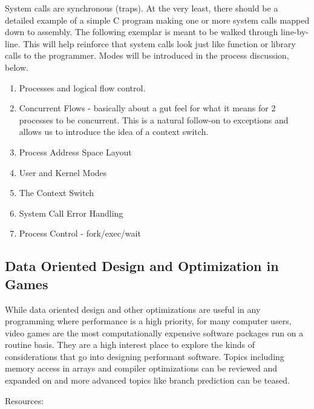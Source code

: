 \documentclass[12pt,letterpaper]{article}
\begin{document}
	System calls are synchronous (traps). At the very least, there should be a detailed example of a simple C program making one or more system calls mapped down to assembly. The following exemplar is meant to be walked through line-by-line. This will help reinforce that system calls look just like function or library calls to the programmer. Modes will be introduced in the process discussion, below.
	
	\begin{enumerate}
		\item Processes and logical flow control.
		\item Concurrent Flows - basically about a gut feel for what it means for 2 processes to be concurrent.  This is a natural follow-on to exceptions and allows us to introduce the idea of a context switch.
		\item Process Address Space Layout
		\item User and Kernel Modes
		\item The Context Switch
		\item System Call Error Handling
		\item Process Control - fork/exec/wait
	\end{enumerate}
	
	\subsection{Data Oriented Design and Optimization in Games}

	While data oriented design and other optimizations are useful in any programming where performance is a high priority, for many computer users, video games are the most computationally expensive software packages run on a routine basis. They are a high interest place to explore the kinds of considerations that go into designing performant software. Topics including memory access in arrays and compiler optimizations can be reviewed and expanded on and more advanced topics like branch prediction can be teased.

	Resources:
	
\end{document}
